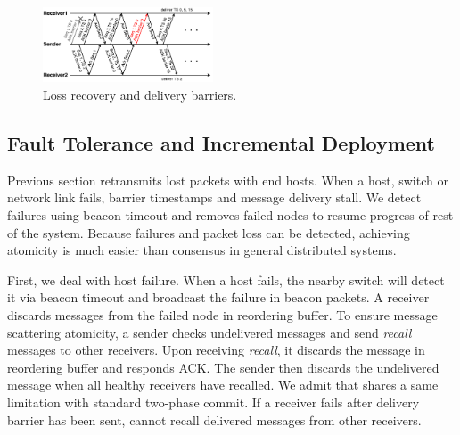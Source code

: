 

\begin{figure}[t]
\centering
\includegraphics[width=0.45\textwidth]{images/loss_detection.pdf}
\caption{Loss recovery and delivery barriers.}
\label{fig:ack-barrier}
\vspace{-0.4em}
\end{figure}




\subsection{Fault Tolerance and Incremental Deployment}
\label{sec:failure}

Previous section retransmits lost packets with end hosts.
When a host, switch or network link fails, barrier timestamps and message delivery stall.
We detect failures using beacon timeout and removes failed nodes to resume progress of rest of the system.
Because failures and packet loss can be detected, achieving atomicity is much easier than consensus in general distributed systems.

First, we deal with host failure.
When a host fails, the nearby switch will detect it via beacon timeout and broadcast the failure in beacon packets.
A receiver discards messages from the failed node in reordering buffer.
To ensure message scattering atomicity, a sender checks undelivered messages and send \textit{recall} messages to other receivers.
Upon receiving \textit{recall}, it discards the message in reordering buffer and responds ACK.
The sender then discards the undelivered message when all healthy receivers have recalled.
We admit that \sys shares a same limitation with standard two-phase commit.
If a receiver fails after delivery barrier has been sent, \sys cannot recall delivered messages from other receivers.


